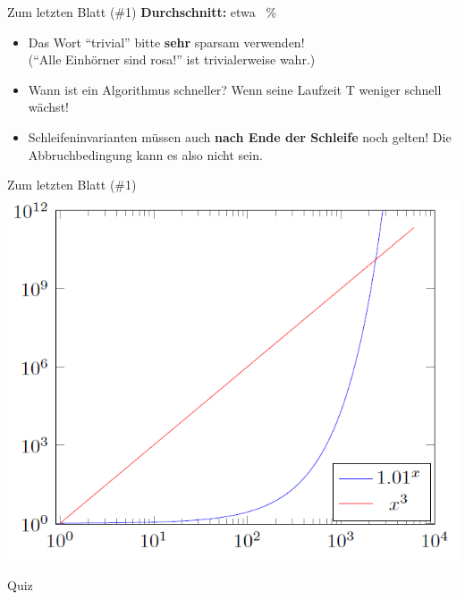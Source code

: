 




	
	
\begin{frame}{Zum letzten Blatt (\#1)}
	\textbf{Durchschnitt:} \quad etwa ~\% \\
	\begin{itemize}
		\item Das Wort \enquote{trivial} bitte \textbf{sehr} sparsam verwenden!\\
			(\enquote{Alle Einhörner sind rosa!} ist trivialerweise wahr.)
		\item Wann ist ein Algorithmus schneller? Wenn seine Laufzeit T weniger schnell wächst!
		\item Schleifeninvarianten müssen auch \textbf{nach Ende der Schleife} noch gelten! Die Abbruchbedingung kann es also nicht sein.
	\end{itemize}
\end{frame}	

\begin{frame}{Zum letzten Blatt (\#1)}
	\centering
	\includegraphics[height=.95\frameheight]{images/polyVsExp}
\end{frame}

\framePrevEpisode

\begin{frame}{Quiz}
	\thasse{\Socrative}
	
\end{frame}


